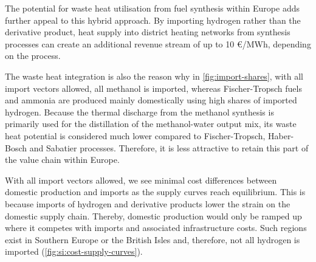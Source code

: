 \documentclass[5p,10pt]{elsarticle}
\begin{document}

The potential for waste heat utilisation from fuel synthesis within Europe adds
further appeal to this hybrid approach. By importing hydrogen rather than the
derivative product, heat supply into district heating networks from synthesis
processes can create an additional revenue stream of up to 10 \euro{}/MWh,
depending on the process.


The waste heat integration is also the reason why in \cref{fig:import-shares},
with all import vectors allowed, all methanol is imported, whereas
Fischer-Tropsch fuels and ammonia are produced mainly domestically using high
shares of imported hydrogen. Because the thermal discharge from the methanol
synthesis is primarily used for the distillation of the methanol-water output
mix, its waste heat potential is considered much lower compared to
Fischer-Tropsch, Haber-Bosch and Sabatier processes. Therefore, it is less
attractive to retain this part of the value chain within Europe.


With all import vectors allowed, we see minimal cost differences between
domestic production and imports as the supply curves reach equilibrium. This is
because imports of hydrogen and derivative products lower the strain on the
domestic supply chain. Thereby, domestic production would only be ramped up
where it competes with imports and associated infrastructure costs. Such regions
exist in Southern Europe or the British Isles and, therefore, not all hydrogen
is imported (\cref{fig:si:cost-supply-curves}).
\end{document}
